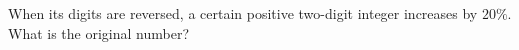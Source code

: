 When its digits are reversed, a certain positive two-digit integer increases by $20\%$. What is the original number?
